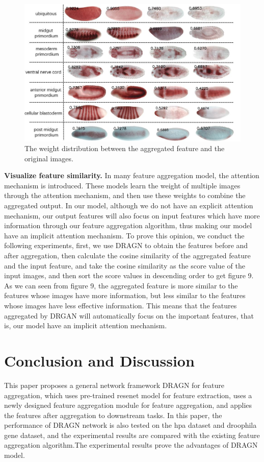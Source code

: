 \documentclass[10pt,twocolumn,letterpaper]{article}
\begin{document}
\begin{figure}
\begin{center}
\includegraphics[width=0.8\linewidth]{flycompare.JPG}
\end{center}
   \caption{The weight distribution between the aggregated feature and the original images.}
\label{fig:short}
\end{figure}

\textbf{Visualize feature similarity.} In many feature aggregation model, the attention mechanism is introduced. These models learn the weight of multiple images through the attention mechanism, and then use these weights to combine the aggregated output. In our model, although we do not have an explicit attention mechanism, our output features will also focus on input features which have more information through our feature aggregation algorithm, thus making our model have an implicit attention mechanism. To prove this opinion, we conduct the following experiments, first, we use DRAGN to obtain the features before and after aggregation, then calculate the cosine similarity of the aggregated feature and the input feature, and take the cosine similarity as the score value of the input images, and then sort the score values in descending order to get figure 9. As we can seen from figure 9, the aggregated feature is more similar to the features whose images have more information, but less similar to the features whose images have less effective information. This means that the features aggregated by DRGAN will automatically focus on the important features, that is, our model have an implicit attention mechanism.


\section{Conclusion and Discussion}
This paper proposes a general network framework DRAGN for feature aggregation, which uses pre-trained resenet model for feature extraction, uses a newly designed feature aggregation module for feature aggregation, and applies the features after aggregation to downstream tasks. In this paper, the performance of DRAGN network is also tested on the hpa dataset and droophila gene dataset, and the experimental results are compared with the existing feature aggregation algorithm.The experimental results prove the advantages of DRAGN model.
\end{document}
